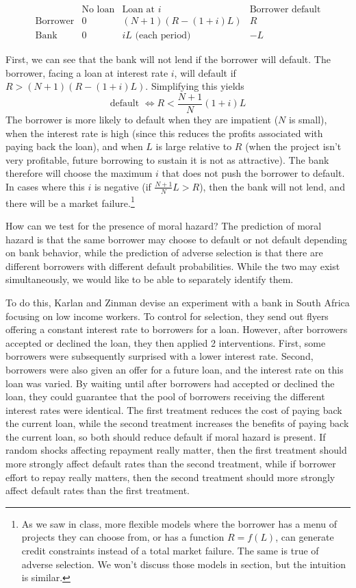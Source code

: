\documentclass[12pt,english]{article}
\begin{document}
$$
\begin{array}{c|c|c|c}
& \text{No loan} & \text{Loan at } i & \text{Borrower default} \\
\hline
\text{Borrower} & 0 & (N + 1) (R - (1 + i)L) & R \\
\hline
\text{Bank} & 0 & iL \text{ (each period)} & -L
\end{array}
$$

First, we can see that the bank will not lend if the borrower will default. The borrower, facing a loan at interest rate $i$, will default if $R > (N + 1)(R - (1 + i)L)$. Simplifying this yields
$$ \text{default } \Leftrightarrow R < \frac{N+1}{N}(1+i)L $$
The borrower is more likely to default when they are impatient ($N$ is small), when the interest rate is high (since this reduces the profits associated with paying back the loan), and when $L$ is large relative to $R$ (when the project isn't very profitable, future borrowing to sustain it is not as attractive). The bank therefore will choose the maximum $i$ that does not push the borrower to default. In cases where this $i$ is negative (if $\frac{N+1}{N}L > R$), then the bank will not lend, and there will be a market failure.\footnote{As we saw in class, more flexible models where the borrower has a menu of projects they can choose from, or has a function $R = f(L)$, can generate credit constraints instead of a total market failure. The same is true of adverse selection. We won't discuss those models in section, but the intuition is similar.}

How can we test for the presence of moral hazard? The prediction of moral hazard is that the same borrower may choose to default or not default depending on bank behavior, while the prediction of adverse selection is that there are different borrowers with different default probabilities. While the two may exist simultaneously, we would like to be able to separately identify them.

To do this, Karlan and Zinman devise an experiment with a bank in South Africa focusing on low income workers. To control for selection, they send out flyers offering a constant interest rate to borrowers for a loan. However, after borrowers accepted or declined the loan, they then applied 2 interventions. First, some borrowers were subsequently surprised with a lower interest rate. Second, borrowers were also given an offer for a future loan, and the interest rate on this loan was varied. By waiting until after borrowers had accepted or declined the loan, they could guarantee that the pool of borrowers receiving the different interest rates were identical. The first treatment reduces the cost of paying back the current loan, while the second treatment increases the benefits of paying back the current loan, so both should reduce default if moral hazard is present. If random shocks affecting repayment really matter, then the first treatment should more strongly affect default rates than the second treatment, while if borrower effort to repay really matters, then the second treatment should more strongly affect default rates than the first treatment.
\end{document}
